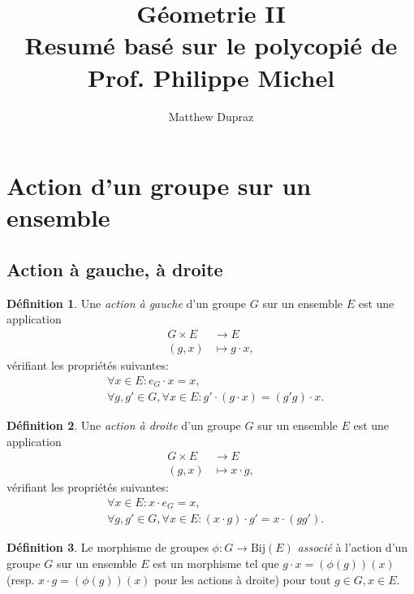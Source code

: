 \documentclass[french]{article}
\theoremstyle{plain}
\theoremstyle{remark}
\theoremstyle{definition}
\newtheorem{defn}{Définition}[section]
\newcommand{\Bij}{\mathrm{Bij}}
\begin{document}
\title{Géometrie II \\
	\large Resumé basé sur le polycopié de Prof. Philippe Michel}
\author{Matthew Dupraz}


\maketitle

\newpage

\tableofcontents

\newpage

\section{Action d'un groupe sur un ensemble}
\subsection{Action à gauche, à droite}

\begin{defn}
	Une \emph{action à gauche} d'un groupe $G$ sur un ensemble $E$
	est une application
	\begin{align*}
		G \times E &\to E \\
		(g, x) &\mapsto g \cdot x,
	\end{align*}
	vérifiant les propriétés suivantes:
	\begin{align*}
		& \forall x \in E: e_G \cdot x = x, \\
		& \forall g, g' \in G, \forall x \in E:
			g' \cdot (g \cdot x) = (g' g) \cdot x.
	\end{align*}
\end{defn}

\begin{defn}
	Une \emph{action à droite} d'un groupe $G$ sur un ensemble $E$
	est une application
	\begin{align*}
		G \times E &\to E \\
		(g, x) &\mapsto x \cdot g,
	\end{align*}
	vérifiant les propriétés suivantes:
	\begin{align*}
		& \forall x \in E: x \cdot e_G = x, \\
		& \forall g, g' \in G, \forall x \in E:
			(x \cdot g) \cdot g' = x \cdot (g g').
	\end{align*}
\end{defn}

\begin{defn}
	Le morphisme de groupes $\phi : G \to \Bij(E)$ \emph{associé}
	à l'action d'un groupe $G$ sur un ensemble $E$
	est un morphisme tel que $g \cdot x = (\phi(g))(x)$
	(resp. $x \cdot g = (\phi(g))(x)$ pour les actions à droite)
	pour tout $g \in G, x \in E$.
\end{defn}
\end{document}
